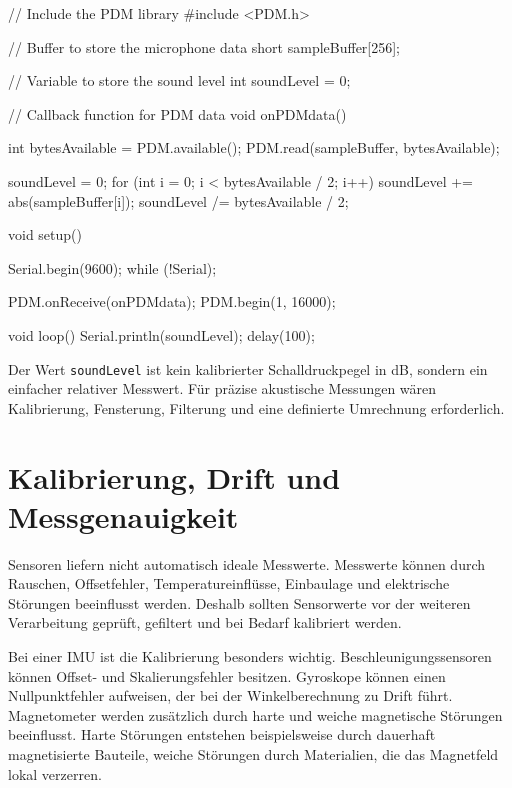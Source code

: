 \begin{code}
\begin{Arduino}
// Include the PDM library
#include <PDM.h>

// Buffer to store the microphone data
short sampleBuffer[256];

// Variable to store the sound level
int soundLevel = 0;

// Callback function for PDM data
void onPDMdata() {
	int bytesAvailable = PDM.available();
	PDM.read(sampleBuffer, bytesAvailable);

	soundLevel = 0;
	for (int i = 0; i < bytesAvailable / 2; i++) {
		soundLevel += abs(sampleBuffer[i]);
	}
	soundLevel /= bytesAvailable / 2;
}

void setup() {
	Serial.begin(9600);
	while (!Serial);

	PDM.onReceive(onPDMdata);
	PDM.begin(1, 16000);
}

void loop() {
	Serial.println(soundLevel);
	delay(100);
}
\end{Arduino}
\caption{Einfaches Beispiel zur Auswertung des integrierten Mikrofons}
\label{code:microphone}
\end{code}

Der Wert \texttt{soundLevel} ist kein kalibrierter Schalldruckpegel in dB, sondern ein einfacher relativer Messwert. Für präzise akustische Messungen wären Kalibrierung, Fensterung, Filterung und eine definierte Umrechnung erforderlich.

\section{Kalibrierung, Drift und Messgenauigkeit}

Sensoren liefern nicht automatisch ideale Messwerte. Messwerte können durch Rauschen, Offsetfehler, Temperatureinflüsse, Einbaulage und elektrische Störungen beeinflusst werden. Deshalb sollten Sensorwerte vor der weiteren Verarbeitung geprüft, gefiltert und bei Bedarf kalibriert werden.

Bei einer IMU ist die Kalibrierung besonders wichtig. Beschleunigungssensoren können Offset- und Skalierungsfehler besitzen. Gyroskope können einen Nullpunktfehler aufweisen, der bei der Winkelberechnung zu Drift führt. Magnetometer werden zusätzlich durch harte und weiche magnetische Störungen beeinflusst. Harte Störungen entstehen beispielsweise durch dauerhaft magnetisierte Bauteile, weiche Störungen durch Materialien, die das Magnetfeld lokal verzerren.

